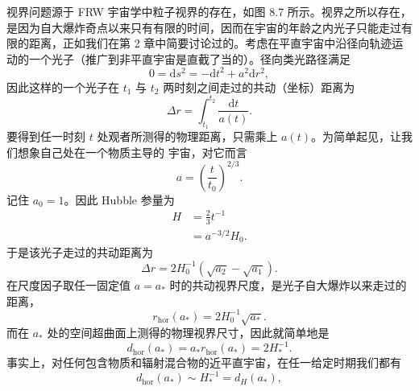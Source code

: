 视界问题源于 FRW 宇宙学中粒子视界的存在，如图 8.7 所示。视界之所以存在，是因为自大爆炸奇点以来只有有限的时间，因而在宇宙的年龄之内光子只能走过有限的距离，正如我们在第 2 章中简要讨论过的。考虑在平直宇宙中沿径向轨迹运动的一个光子（推广到非平直宇宙是直截了当的）。径向类光路径满足
\begin{equation*}
0 = \mathrm{d}s^{2} = -\mathrm{d}t^{2} + a^{2}\mathrm{d}r^{2},
\tag{8.181}
\end{equation*}
因此这样的一个光子在 $t_{1}$ 与 $t_{2}$ 两时刻之间走过的共动（坐标）距离为
\begin{equation*}
\Delta r = \int_{t_{1}}^{t_{2}}\frac{\mathrm{d}t}{a(t)}.
\tag{8.182}
\end{equation*}
要得到任一时刻 $t$ 处观者所测得的物理距离，只需乘上 $a(t)$。为简单起见，让我们想象自己处在一个物质主导的
宇宙，对它而言
\begin{equation*}
a = \left(\frac{t}{t_{0}}\right)^{2/3}.
\tag{8.183}
\end{equation*}
记住 $a_{0}=1$。因此 Hubble 参量为
\begin{equation*}
\begin{aligned}
H &= \frac{2}{3}t^{-1} \\
&= a^{-3/2}H_{0}.
\end{aligned}
\tag{8.184}
\end{equation*}
于是该光子走过的共动距离为
\begin{equation*}
\Delta r = 2H_{0}^{-1}\left(\sqrt{a_{2}}-\sqrt{a_{1}}\right).
\tag{8.185}
\end{equation*}
在尺度因子取任一固定值 $a=a_{*}$ 时的共动视界尺度，是光子自大爆炸以来走过的距离，
\begin{equation*}
r_{\mathrm{hor}}(a_{*}) = 2H_{0}^{-1}\sqrt{a_{*}}.
\tag{8.186}
\end{equation*}
而在 $a_{*}$ 处的空间超曲面上测得的物理视界尺寸，因此就简单地是
\begin{equation*}
d_{\mathrm{hor}}(a_{*}) = a_{*}r_{\mathrm{hor}}(a_{*}) = 2H_{*}^{-1}.
\tag{8.187}
\end{equation*}
事实上，对任何包含物质和辐射混合物的近平直宇宙，在任一给定时期我们都有
\begin{equation*}
d_{\mathrm{hor}}(a_{*}) \sim H_{*}^{-1} = d_{H}(a_{*}),
\tag{8.188}
\end{equation*}

